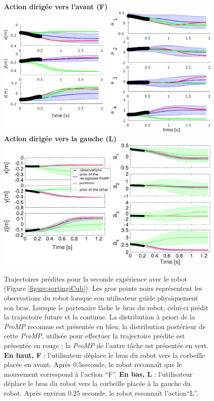 \documentclass[utf8]{frontiersSCNS} %
\begin{document}
\begin{figure}[ht]
\centering
\textbf{Action dirigée vers l'avant (F)}\\
\includegraphics[width=0.8\hsize]{img/FRONT2modif.pdf}\\
\textbf{Action dirigée vers la gauche (L)}\\
\includegraphics[width=0.8\hsize]{img/FigLeft.pdf}
\caption{Trajectoires prédites pour la seconde expérience avec le robot (Figure \ref{figure:sortingiCub}). Les gros points noirs représentent les observations du robot lorsque son utilisateur guide physiquement son bras. Lorsque le partenaire lâche le bras du robot, celui-ci prédit la trajectoire future et la continue. La distribution à priori de la \textit{ProMP} reconnue est présentée en bleu; la distribution postérieur de cette \textit{ProMP}, utilisée pour effectuer la trajectoire prédite est présentée en rouge ; la \textit{ProMP} de l'autre tâche est présentée en vert. \textbf{En haut, F} : l'utilisateur déplace le bras du robot vers la corbeille placée en avant. Après $0.5$seconde, le robot reconnaît que le mouvement correspond à l'action ``F''. \textbf{En bas, L} : l'utilisateur déplace le bras du robot vers la corbeille placée à la gauche du robot. Après environ $0.25$ seconde, le robot reconnaît l'action``L''.}
\label{figure:sortingiCubTrajectories}
\end{figure}
\end{document}

